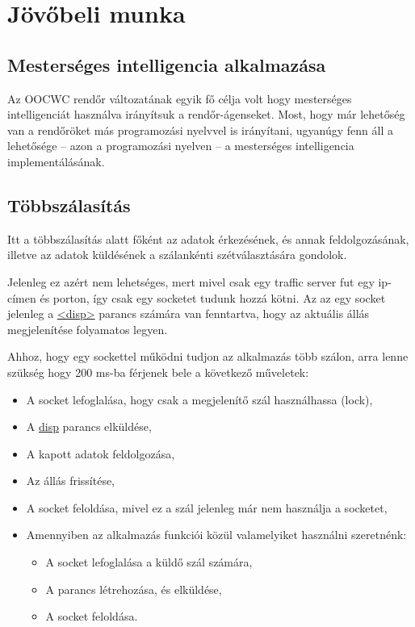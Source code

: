 \documentclass[a4paper,12pt]{report}
\begin{document}
\chapter{Jövőbeli munka}
\label{futureworks}

\section{Mesterséges intelligencia alkalmazása}

Az OOCWC rendőr változatának egyik fő célja volt hogy mesterséges intelligenciát használva irányítsuk a rendőr-ágenseket. Most, hogy már lehetőség van a rendőröket más programozási nyelvvel is irányítani, ugyanúgy fenn áll a lehetősége -- azon a programozási nyelven -- a mesterséges intelligencia implementálásának.

\section{Többszálasítás}

Itt a többszálasítás alatt főként az adatok érkezésének, és annak feldolgozásának, illetve az adatok küldésének a szálankénti szétválasztására gondolok. 

\vspace{2mm}
Jelenleg ez azért nem lehetséges, mert mivel csak egy traffic server fut egy ip-címen és porton, így csak egy socketet tudunk hozzá kötni. Az az egy socket jelenleg a \url{<disp>} parancs számára van fenntartva, hogy az aktuális állás megjelenítése folyamatos legyen. 

\vspace{2mm}
Ahhoz, hogy egy sockettel működni tudjon az alkalmazás több szálon, arra lenne szükség hogy 200 ms-ba férjenek bele a következő műveletek:

\begin{itemize}
\item A socket lefoglalása, hogy csak a megjelenítő szál használhassa (lock),
\item A \url{disp} parancs elküldése,
\item A kapott adatok feldolgozása,
\item Az állás frissítése,
\item A socket feloldása, mivel ez a szál jelenleg már nem használja a socketet,
\item Amennyiben az alkalmazás funkciói közül valamelyiket használni szeretnénk:
	\begin{itemize}
	\item A socket lefoglalása a küldő szál számára,
	\item A parancs létrehozása, és elküldése,
	\item A socket feloldása.
	\end{itemize}
\end{itemize}
\end{document}
